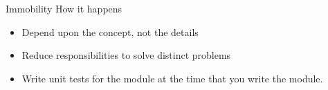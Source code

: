 \documentclass[xcolor=svgnames]{beamer}
\begin{document}
{%
%
\begin{frame}{\subsecname}
    \begin{minipage}{\columnwidth}
    \end{minipage}
\end{frame}
}


{%
%
\begin{frame}{\subsecname}
    \begin{minipage}{\columnwidth}
    \end{minipage}
\end{frame}
}


{%
%
\begin{frame}{\subsecname}
    \begin{minipage}{\columnwidth}
    \end{minipage}
\end{frame}
}


{%
%
\begin{frame}{Immobility}
    How it happens
    \begin{itemize}
        \item<1-> Depend upon the concept, not the details
        \item<2-> Reduce responsibilities to solve distinct problems
        \item<3-> Write unit tests for the module at the time that you write 
                  the module.
    \end{itemize}
\end{frame}
}
\end{document}
